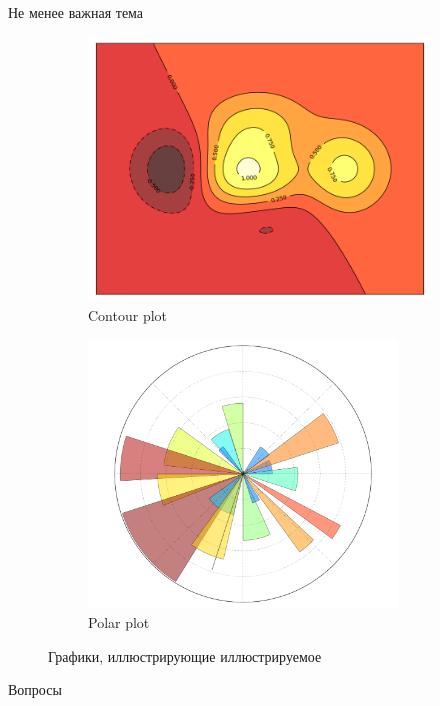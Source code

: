 \documentclass[10pt]{beamer}
\begin{document}
\begin{frame}{Не менее важная тема}

\begin{figure}
        \centering
        \begin{subfigure}[b]{0.5\textwidth}
                \includegraphics[width=\textwidth]{images/contour.png}
                \caption{Contour plot}                
        \end{subfigure}%
        \begin{subfigure}[b]{0.5\textwidth}
                \includegraphics[width=0.9\textwidth]{images/polar.png}
                \caption{Polar plot}                
        \end{subfigure}       
        \caption{Графики, иллюстрирующие иллюстрируемое}
\end{figure}

\end{frame}

\begin{frame}[plain]
\begin{center}
{\Large Вопросы}
\end{center}
\end{frame}
\end{document}
